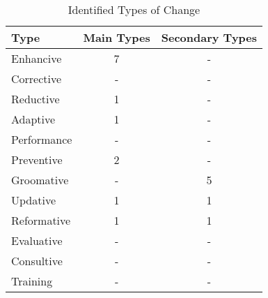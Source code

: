 \documentclass{sig-alternate}
\begin{document}
\begin{table}
       \centering
       \begin{tabular}[ht]{l|c|c}
              \toprule

              \textbf{Type}        & \textbf{Main Types}       &\textbf{Secondary Types}   \\ \midrule
              Enhancive            & 7                         & -                         \\ \hline
              Corrective           & -                         & -                         \\ \hline
              Reductive            & 1                         & -                         \\ \hline
              Adaptive             & 1                         & -                         \\ \hline
              Performance          & -                         & -                         \\ \hline
              Preventive           & 2                         & -                         \\ \hline
              Groomative           & -                         & 5                         \\ \hline
              Updative             & 1                         & 1                         \\ \hline
              Reformative          & 1                         & 1                         \\ \hline
              Evaluative           & -                         & -                         \\ \hline
              Consultive           & -                         & -                         \\ \hline
              Training             & -                         & -                         \\ 

              \bottomrule

       \end{tabular}
       \caption{Identified Types of Change}
       \label{table:type_counts}
\end{table}
\end{document}
